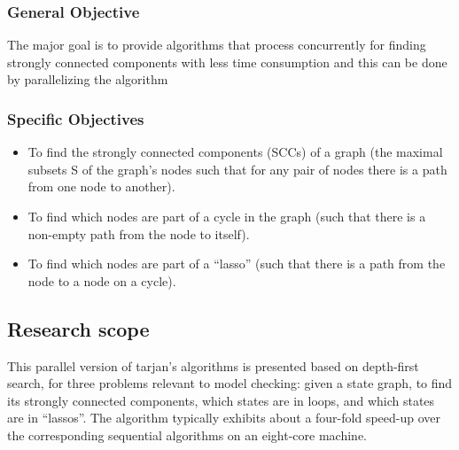 \documentclass{article}
\begin{document}
\subsubsection{General Objective }{The major goal is to provide algorithms that process concurrently for finding strongly connected components \cite{ref1} with less time consumption and this can be done by parallelizing the algorithm}
\subsubsection{Specific Objectives}
\begin{itemize}

\item	To find the strongly connected components (SCCs) of a graph (the maximal subsets S of the graph’s nodes such that for any pair of nodes there is a path from one node to another).

\item To find which nodes are part of a cycle in the graph (such that there is a non-empty path from the node to itself).

\item  To find which nodes are part of a “lasso” (such that there is a path from the node to a node on a cycle).
\end{itemize}

\subsection{Research scope}{This parallel version of tarjan’s algorithms is presented based on depth-first search, for three problems relevant to model checking: given a state graph, to find its strongly connected components, which states are in loops, and which states are in “lassos”. The algorithm typically exhibits about a four-fold speed-up over the corresponding sequential algorithms on an eight-core machine\cite{ref3}.}



\end{document}
